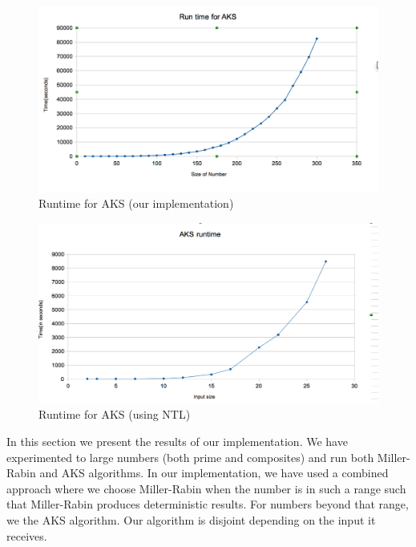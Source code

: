 \documentclass[paper=a4, fontsize=11pt]{scrartcl}	%
\numberwithin{equation}{section}		%
\numberwithin{figure}{section}		%
\numberwithin{table}{section}		%
\begin{document}
\begin{figure}[t]
\begin{centering}
\includegraphics[scale=0.4]{./AKS.png}
\par\end{centering}

\caption{Runtime for AKS (our implementation)\label{fig:AKS}}

\end{figure}


\begin{figure}[t]
\begin{centering}
\includegraphics[scale=0.4]{./aks-ntl.png}
\par\end{centering}

\caption{Runtime for AKS (using NTL)\label{fig:AKS:NTL}}

\end{figure}

In this section we present the results of our implementation. We have experimented to large numbers (both prime and composites) and run both Miller-Rabin and AKS algorithms. In our implementation, we have used a  combined approach where we choose Miller-Rabin when the number is in such a range such that Miller-Rabin produces deterministic results. For numbers beyond that range, we the AKS algorithm. Our algorithm is disjoint depending on the input it receives. \\
\end{document}
